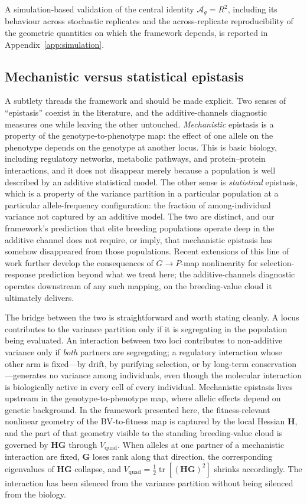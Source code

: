 \documentclass[9pt,twocolumn,twoside,lineno]{gsajnl}
\newcommand{\mat}[1]{\mathbf{#1}}
\newcommand{\tr}{\ensuremath{\operatorname{tr}}\xspace}
\newcommand{\Ag}{\ensuremath{\mathcal{A}_{g}}\xspace}
\newcommand{\Vquad}{\ensuremath{V_{\text{quad}}}\xspace}
\begin{document}
A simulation-based validation of the central identity $\Ag = R^2$, including its behaviour across stochastic replicates and the across-replicate reproducibility of the geometric quantities on which the framework depends, is reported in Appendix~\ref{app:simulation}.

\subsection{Mechanistic versus statistical epistasis}
\label{sec:mech_vs_stat}

A subtlety threads the framework and should be made explicit. Two senses of ``epistasis'' coexist in the literature, and the additive-channels diagnostic measures one while leaving the other untouched. \emph{Mechanistic} epistasis is a property of the genotype-to-phenotype map: the effect of one allele on the phenotype depends on the genotype at another locus. This is basic biology, including regulatory networks, metabolic pathways, and protein--protein interactions, and it does not disappear merely because a population is well described by an additive statistical model. The other sense is \emph{statistical} epistasis, which is a property of the variance partition in a particular population at a particular allele-frequency configuration: the fraction of among-individual variance not captured by an additive model. The two are distinct, and our framework's prediction that elite breeding populations operate deep in the additive channel does not require, or imply, that mechanistic epistasis has somehow disappeared from those populations. Recent extensions of this line of work \citep{Morrissey2015, GonzalezForero2026} further develop the consequences of $G\!\to\!P$-map nonlinearity for selection-response prediction beyond what we treat here; the additive-channels diagnostic operates downstream of any such mapping, on the breeding-value cloud it ultimately delivers.

The bridge between the two is straightforward and worth stating cleanly. A locus contributes to the variance partition only if it is segregating in the population being evaluated. An interaction between two loci contributes to non-additive variance only if \emph{both} partners are segregating; a regulatory interaction whose other arm is fixed---by drift, by purifying selection, or by long-term conservation---generates no variance among individuals, even though the molecular interaction is biologically active in every cell of every individual. Mechanistic epistasis lives upstream in the genotype-to-phenotype map, where allelic effects depend on genetic background. In the framework presented here, the fitness-relevant nonlinear geometry of the BV-to-fitness map is captured by the local Hessian $\mat{H}$, and the part of that geometry visible to the standing breeding-value cloud is governed by $\mat{H}\mat{G}$ through $\Vquad$. When alleles at one partner of a mechanistic interaction are fixed, $\mat{G}$ loses rank along that direction, the corresponding eigenvalues of $\mat{H}\mat{G}$ collapse, and $\Vquad = \tfrac{1}{2}\tr[(\mat{H}\mat{G})^2]$ shrinks accordingly. The interaction has been silenced from the variance partition without being silenced from the biology.
\end{document}
